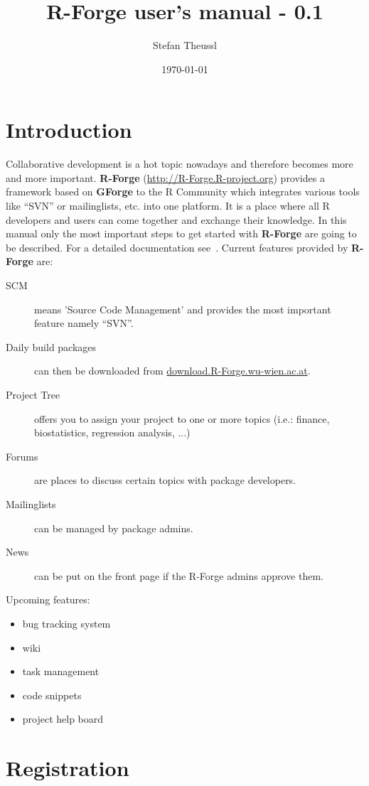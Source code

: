 \documentclass[a4paper]{article}
\title{R-Forge user's manual - 0.1}
\author{Stefan Theussl}
\date{\today}
\begin{document}
\maketitle


\section{Introduction}
\label{sec:intro}
Collaborative development is a hot topic nowadays and therefore becomes
more and more important. \textbf{R-Forge}
(\url{http://R-Forge.R-project.org}) provides a framework based on
\textbf{GForge} to the R Community which integrates various tools like
``SVN'' or mailinglists, etc. into one platform. It is a
place where all R developers and users can come together and exchange
their knowledge. In this manual only the most important steps to get
started with \textbf{R-Forge} are going to be described. For a detailed
documentation see~\cite{manual:gforge}.\newline
\newline
Current features provided by \textbf{R-Forge} are:
\begin{description}
\item[SCM] means 'Source Code Management' and provides the most
  important feature namely ``SVN''.
\item[Daily build packages] can then be downloaded from
  \url{download.R-Forge.wu-wien.ac.at}.
\item[Project Tree] offers you to assign your project to one or more
  topics (i.e.: finance, biostatistics, regression analysis, ...)
\item[Forums] are places to discuss certain topics with package
  developers.
\item[Mailinglists] can be managed by package admins.
\item[News] can be put on the front page if the R-Forge admins approve
  them.
\end{description}
Upcoming features:
\begin{itemize}
\item bug tracking system
\item wiki
\item task management
\item code snippets
\item project help board
\end{itemize}



\section{Registration}
\label{sec:registration}
\end{document}
